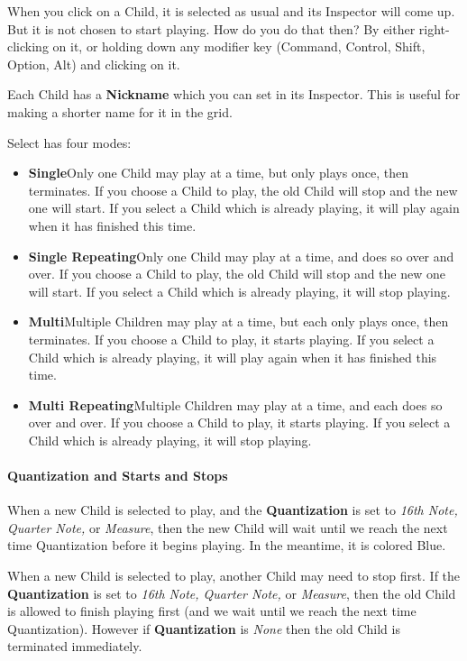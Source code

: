 \documentclass[twoside,10pt]{article}
\begin{document}
When you click on a Child, it is selected as usual and its Inspector will come up.  But it is not chosen to start playing.  How do you do that then?  By either right-clicking on it, or holding down any modifier key (Command, Control, Shift, Option, Alt) and clicking on it.

Each Child has a {\bf Nickname} which you can set in its Inspector.  This is useful for making a shorter name for it in the grid.



Select has four modes:

\begin{itemize}
\item{\bf Single}\quad Only one Child may play at a time, but only plays once, then terminates.  If you choose a Child to play, the old Child will stop and the new one will start.  If you select a Child which is already playing, it will play again when it has finished this time.
\item{\bf Single Repeating}\quad Only one Child may play at a time, and does so over and over.  If you choose a Child to play, the old Child will stop and the new one will start.  If you select a Child which is already playing, it will stop playing.
\item{\bf Multi}\quad Multiple Children may play at a time, but each only plays once, then terminates.  If you choose a Child to play, it starts playing.   If you select a Child which is already playing, it will play again when it has finished this time.
\item{\bf Multi Repeating}\quad Multiple Children may play at a time, and each does so over and over.  If you choose a Child to play, it starts playing.  If you select a Child which is already playing, it will stop playing.
\end{itemize}

\paragraph{Quantization and Starts and Stops}

When a new Child is selected to play, and the {\bf Quantization} is set to {\it 16th Note, Quarter Note,} or {\it Measure}, then the new Child will wait until we reach the next time Quantization before it begins playing.  In the meantime, it is colored Blue.

When a new Child is selected to play, another Child may need to stop first.   If the {\bf Quantization} is set to {\it 16th Note, Quarter Note,} or {\it Measure}, then the old Child is allowed to finish playing first (and we wait until we reach the next time Quantization).  However if {\bf Quantization} is {\it None} then the old Child is terminated immediately.
\end{document}
